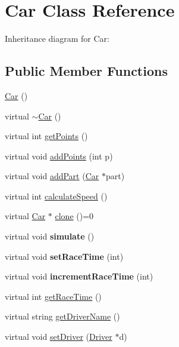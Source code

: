 \hypertarget{classCar}{}\section{Car Class Reference}
\label{classCar}


Inheritance diagram for Car\+:
\subsection*{Public Member Functions}
\begin{DoxyCompactItemize}
\item 
\hyperlink{classCar_a1c803f7c5038d3e31b368b0d0a35493c}{Car} ()
\item 
virtual \hyperlink{classCar_a5933bb06e96b159fe339a128abda888a}{$\sim$\+Car} ()
\item 
virtual int \hyperlink{classCar_a0e0b71dc2b09be094ffb08e5b73c8ea2}{get\+Points} ()
\item 
virtual void \hyperlink{classCar_a946872fcdb7625c343e5caf90fa39617}{add\+Points} (int p)
\item 
virtual void \hyperlink{classCar_a97c6c4d86fd756e496871bda0651c5c6}{add\+Part} (\hyperlink{classCar}{Car} $\ast$part)
\item 
virtual int \hyperlink{classCar_aadb72568edbdf571547ec48e9781237f}{calculate\+Speed} ()
\item 
virtual \hyperlink{classCar}{Car} $\ast$ \hyperlink{classCar_a5a54bbfe8e72022f4d9fdf6ecc990d99}{clone} ()=0
\item 
\mbox{\label{classCar_af2532d9bbcda730f936f9633d8ee8d71}} 
virtual void {\bfseries simulate} ()
\item 
\mbox{\label{classCar_a72a79de673e860c1f177791bee87c529}} 
virtual void {\bfseries set\+Race\+Time} (int)
\item 
\mbox{\label{classCar_a3944276e317e680a756ac58e7bac6e6f}} 
virtual void {\bfseries increment\+Race\+Time} (int)
\item 
virtual int \hyperlink{classCar_ac30e13eba209c1ca3bba99bf6741094a}{get\+Race\+Time} ()
\item 
virtual string \hyperlink{classCar_a0192991111c42f7cba809cc9831cd5f3}{get\+Driver\+Name} ()
\item 
virtual void \hyperlink{classCar_ad7148bd1abe107ce2e2b134f78582c9d}{set\+Driver} (\hyperlink{classDriver}{Driver} $\ast$d)

\end{DoxyCompactItemize}
